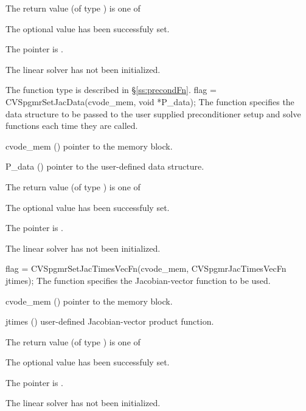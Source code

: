 {
  The return value  (of type ) is one of
  \begin{args}
  \item[\Id{SUCCESS}] 
    The optional value has been successfuly set.
  \item[\Id{LIN\_NO\_MEM}]
    The  pointer is .
  \item[\Id{LIN\_NO\_LMEM}]
    The {\cvspgmr} linear solver has not been initialized.
  \end{args}
}
{
   The function type  is described in \S\ref{ss:precondFn}.
}
{
  flag = CVSpgmrSetJacData(cvode\_mem, void *P\_data);
}
{
  The function  specifies the data structure
  to be passed to the user supplied preconditioner setup and solve
  functions each time they are called.
}
{
  \begin{args}
  \item[cvode\_mem] ()
    pointer to the {\cvode} memory block.
  \item[P\_data] ()
     pointer to the user-defined data structure.
  \end{args}
}
{
  The return value  (of type ) is one of
  \begin{args}
  \item[\Id{SUCCESS}] 
    The optional value has been successfuly set.
  \item[\Id{LIN\_NO\_MEM}]
    The  pointer is .
  \item[\Id{LIN\_NO\_LMEM}]
    The {\cvspgmr} linear solver has not been initialized.
  \end{args}
}
{}
{
  flag = CVSpgmrSetJacTimesVecFn(cvode\_mem, CVSpgmrJacTimesVecFn jtimes);
}
{
  The function  specifies the Jacobian-vector 
  function to be used.
}
{
  \begin{args}
  \item[cvode\_mem] ()
    pointer to the {\cvode} memory block.
  \item[jtimes] ()
    user-defined Jacobian-vector product function.
  \end{args}
}
{
  The return value  (of type ) is one of
  \begin{args}
  \item[\Id{SUCCESS}] 
    The optional value has been successfuly set.
  \item[\Id{LIN\_NO\_MEM}]
    The  pointer is .
  \item[\Id{LIN\_NO\_LMEM}]
    The {\cvspgmr} linear solver has not been initialized.
  \end{args}
}
